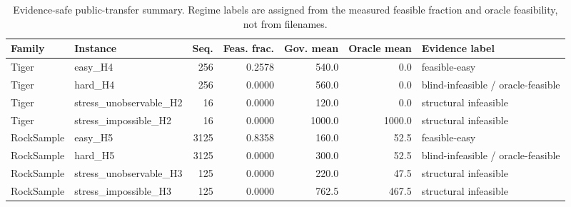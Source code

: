 \begin{table}[t]
\centering
\scriptsize
\caption{Evidence-safe public-transfer summary. Regime labels are assigned from the measured feasible fraction and oracle feasibility, not from filenames.}
\label{tab:public_transfer_regime_safe}
\begin{tabular}{llrrrrl}
\toprule
Family & Instance & Seq. & Feas. frac. & Gov. mean & Oracle mean & Evidence label \\
\midrule
Tiger & easy\_H4 & 256 & 0.2578 & 540.0 & 0.0 & feasible-easy \\
Tiger & hard\_H4 & 256 & 0.0000 & 560.0 & 0.0 & blind-infeasible / oracle-feasible \\
Tiger & stress\_unobservable\_H2 & 16 & 0.0000 & 120.0 & 0.0 & structural infeasible \\
Tiger & stress\_impossible\_H2 & 16 & 0.0000 & 1000.0 & 1000.0 & structural infeasible \\
RockSample & easy\_H5 & 3125 & 0.8358 & 160.0 & 52.5 & feasible-easy \\
RockSample & hard\_H5 & 3125 & 0.0000 & 300.0 & 52.5 & blind-infeasible / oracle-feasible \\
RockSample & stress\_unobservable\_H3 & 125 & 0.0000 & 220.0 & 47.5 & structural infeasible \\
RockSample & stress\_impossible\_H3 & 125 & 0.0000 & 762.5 & 467.5 & structural infeasible \\
\bottomrule
\end{tabular}
\end{table}
